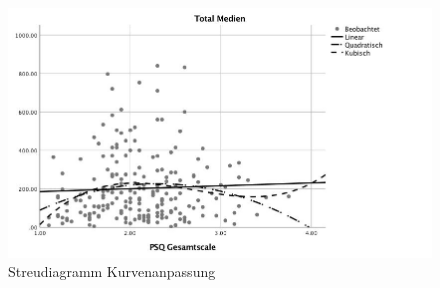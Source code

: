 \begin{figure}[h]
  \centering
     \includegraphics[scale=0.4]{content/Grafik/Streudiagramm_Hypo2_Kurvenanpassung.jpg}
  \caption{Streudiagramm Kurvenanpassung}
  \label{fig:AppHypo2StreudiagrammKurvenanpassung}
\end{figure}